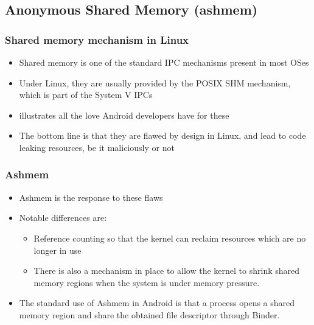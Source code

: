 \subsection{Anonymous Shared Memory (ashmem)}
\begin{frame}
  \frametitle{Shared memory mechanism in Linux}
  \begin{itemize}
  \item Shared memory is one of the standard IPC mechanisms present in most OSes
  \item Under Linux, they are usually provided by the POSIX SHM
    mechanism, which is part of the System V IPCs
  \item {} illustrates all the
    love Android developers have for these
  \item The bottom line is that they are flawed by design in Linux,
    and lead to code leaking resources, be it maliciously or not
  \end{itemize}
\end{frame}

\begin{frame}
  \frametitle{Ashmem}
  \begin{itemize}
  \item Ashmem is the response to these flaws
  \item Notable differences are:
    \begin{itemize}
    \item Reference counting so that the kernel can reclaim resources
       which are no longer in use
    \item There is also a mechanism in place to allow the kernel to
      shrink shared memory regions when the system is under memory
      pressure.
    \end{itemize}
  \item The standard use of Ashmem in Android is that a process opens
    a shared memory region and share the obtained file descriptor
    through Binder.
  \end{itemize}
\end{frame}
